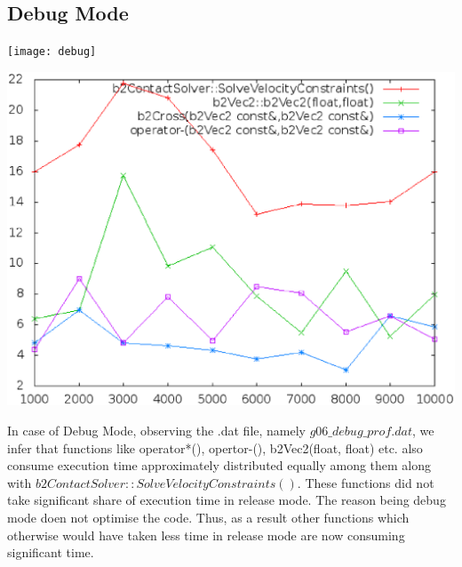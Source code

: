 \documentclass[10pt]{article}
\begin{document}
\subsection{Debug Mode}
\texttt{[image: debug]}
\begin{center}
\includegraphics[scale=0.4]{debug1}
\end{center}
In case of Debug Mode, observing the .dat file, namely $g06\_debug\_prof.dat$, we infer that functions like operator*(), opertor-(), b2Vec2(float, float) etc. also consume execution time approximately distributed equally among them along with $b2ContactSolver::SolveVelocityConstraints()$. These functions did not take significant share of execution time in release mode. The reason being debug mode doen not optimise the code. Thus, as a result other functions which otherwise would have taken less time in release mode are now consuming significant time.
\end{document}
